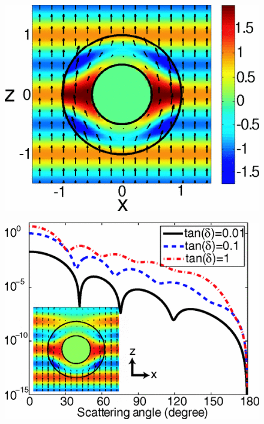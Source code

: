\documentclass[a4paper, 12pt]{article}
\begin{document}
\begin{figure}[h]
  \centering
  \includegraphics[height=0.25\paperheight]{fig2.png}
  \caption{}
  \label{fig:2}
\end{figure}

\begin{figure}[h]
  \centering
  \includegraphics[height=0.3\paperheight]{fig3.png}
  \caption{}
  \label{fig:3}
\end{figure}
\end{document}
